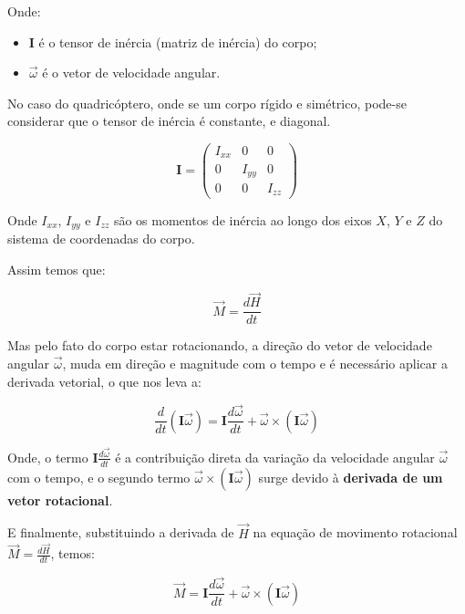 Onde:
\begin{itemize}
    \item \(\mathbf{I}\) é o tensor de inércia (matriz de inércia) do corpo;
    \item \(\vec{\omega}\) é o vetor de velocidade angular.
\end{itemize}

No caso do quadricóptero, onde se um corpo rígido e simétrico, pode-se considerar que o tensor de inércia é constante, e diagonal. 

\begin{equation}
	\boldsymbol{I} = \begin{pmatrix}
		I_{xx} & 0      & 0      \\
		0      & I_{yy} & 0      \\
		0      & 0      & I_{zz}
	\end{pmatrix}
\end{equation}

Onde \( I_{xx} \), \( I_{yy} \) e \( I_{zz} \) são os momentos de inércia ao longo dos eixos \( X \), \( Y \) e \( Z \) do sistema de coordenadas do corpo. 

Assim temos que:

\begin{equation}
\vec{M} = \frac{d\vec{H}}{dt}
\end{equation}

Mas pelo fato do corpo estar rotacionando, a direção do vetor de velocidade angular \(\vec{\omega}\), muda em direção e magnitude com o tempo e é necessário aplicar a derivada vetorial, o que nos leva a:

\begin{equation}
\frac{d}{dt} (\mathbf{I} \vec{\omega}) = \mathbf{I} \frac{d\vec{\omega}}{dt} + \vec{\omega} \times (\mathbf{I} \vec{\omega})
\end{equation}

Onde, o termo \(\mathbf{I} \frac{d\vec{\omega}}{dt}\) é a contribuição direta da variação da velocidade angular \(\vec{\omega}\) com o tempo, e o segundo termo \(\vec{\omega} \times (\mathbf{I} \vec{\omega})\) surge devido à \textbf{derivada de um vetor rotacional}.

E finalmente, substituindo a derivada de \(\vec{H}\) na equação de movimento rotacional \(\vec{M} = \frac{d\vec{H}}{dt}\), temos:


\begin{equation}
\vec{M} = \mathbf{I} \frac{d\vec{\omega}}{dt} + \vec{\omega} \times (\mathbf{I} \vec{\omega})
\end{equation}

